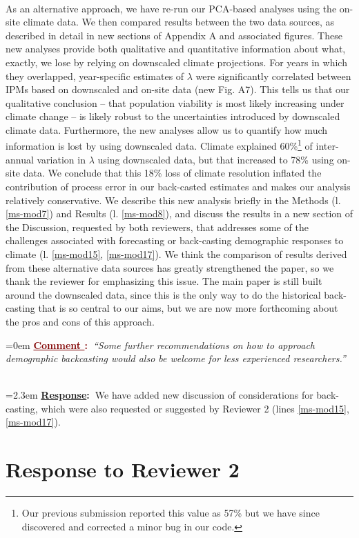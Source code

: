 \documentclass[12pt]{article}
\newcounter{cN}
\newcommand{\comment}[1]{
	\vspace{2em}
	\refstepcounter{cN} %
	\noindent \hangindent=0em \textbf{\textcolor{Maroon}{\uline{Comment \thecN}:~}}\emph{``#1''}
	}
\newcommand{\response}[1]{
	\\[0.25em]
	\hangindent=2.3em \textbf{\textcolor{NavyBlue}{\uline{Response}:~}}#1
	}
\begin{document}
{\\
As an alternative approach, we have re-run our PCA-based analyses using the on-site climate data. 
We then compared results between the two data sources, as described in detail in new sections of Appendix A and associated figures.
These new analyses provide both qualitative and quantitative information about what, exactly, we lose by relying on downscaled climate projections. 
For years in which they overlapped, year-specific estimates of $\lambda$ were significantly correlated between IPMs based on downscaled and on-site data (new Fig. A7). 
This tells us that our qualitative conclusion -- that population viability is most likely increasing under climate change -- is likely robust to the uncertainties introduced by downscaled climate data. 
Furthermore, the new analyses allow us to quantify how much information is lost by using downscaled data.
Climate explained 60\%\footnote{Our previous submission reported this value as 57\% but we have since discovered and corrected a minor bug in our code.} of inter-annual variation in $\lambda$ using downscaled data, but that increased to 78\% using on-site data. 
We conclude that this 18\% loss of climate resolution inflated the contribution of process error in our back-casted estimates and makes our analysis relatively conservative. 
We describe this new analysis briefly in the Methods (l. \ref{ms-mod7}) and Results (l. \ref{ms-mod8}), and discuss the results in a new section of the Discussion, requested by both reviewers, that addresses some of the challenges associated with forecasting or back-casting demographic responses to climate (l. \ref{ms-mod15}, \ref{ms-mod17}).
We think the comparison of results derived from these alternative data sources has greatly strengthened the paper, so we thank the reviewer for emphasizing this issue.
The main paper is still built around the downscaled data, since this is the only way to do the historical back-casting that is so central to our aims, but we are now more forthcoming about the pros and cons of this approach.
}

\comment{Some further recommendations on how to approach demographic backcasting would also be welcome for less experienced researchers.}
\response{We have added new discussion of considerations for back-casting, which were also requested or suggested by Reviewer 2 (lines \ref{ms-mod15}, \ref{ms-mod17}).}

\section{Response to Reviewer 2}
\vspace{-2em}
\end{document}
